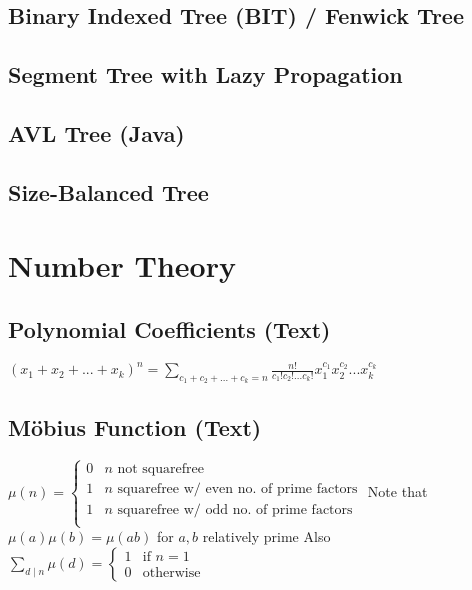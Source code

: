\documentclass[9pt]{extarticle}
\begin{document}
\begin{multicols}{3}
\subsection{Binary Indexed Tree (BIT) / Fenwick Tree}


\subsection{Segment Tree with Lazy Propagation}


\subsection{AVL Tree (Java)}


\subsection{Size-Balanced Tree}


\section{Number Theory}
\subsection{Polynomial Coefficients (Text)}
$(x_1 + x_2 + ... + x_k)^n = \sum_{c_1 + c_2 + ... + c_k = n} \frac{n!}{c_1! c_2! ... c_k!} x_1^{c_1} x_2^{c_2} ... x_k^{c_k}$

\subsection{M\"obius Function (Text)}
$\mu(n) = \begin{cases}
0 & \text{$n$ not squarefree} \\
1 & \text{$n$ squarefree w/ even no. of prime factors} \\
1 & \text{$n$ squarefree w/ odd no. of prime factors} \\
\end{cases}$
Note that $\mu(a) \mu(b) = \mu(ab)$ for $a, b$ relatively prime
Also $\sum_{d \mid n} \mu(d) = \begin{cases} 1 & \text{if $n = 1$} \\ 0 & \text{otherwise} \end{cases}$


\end{multicols}
\end{document}
